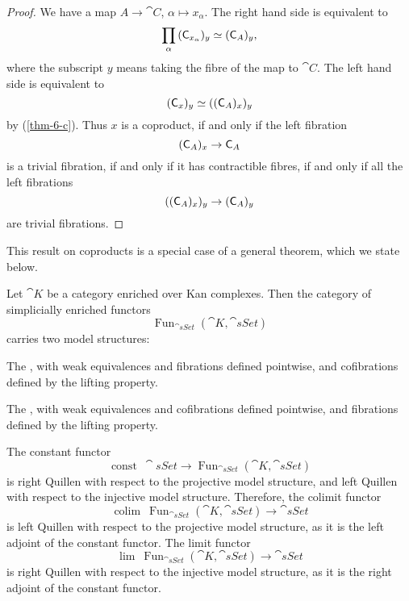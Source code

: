 \begin{proof}
    We have a map $A\to\cat{C}$, $\alpha\mapsto x_\alpha$.
    The right hand side is equivalent to  
    \[ \prod_\alpha{}(\textup{\textsf{C}}_{x_\alpha\/})_y
    \simeq (\textup{\textsf{C}}_{A\/})_y, \]
    where the subscript $y$ means taking the fibre of the map to $\cat C$.
    The left hand side is equivalent to 
    \[ (\textup{\textsf{C}}_{x\/})_y\simeq((\textup{\textsf{C}}_{A\/})_{x\/})_y \]
    by (\ref{thm-6-c}). Thus $x$ is a coproduct, if and only if the left fibration
    \[(\textup{\textsf{C}}_{A\/})_{x\/}\to\textup{\textsf{C}}_{A\/}\]
    is a trivial fibration,
    if and only if it has contractible fibres,
    if and only if all the left fibrations
    \[((\textup{\textsf{C}}_{A\/})_{x\/})_y\to(\textup{\textsf{C}}_{A\/})_y\]
    are trivial fibrations.
\end{proof}

This result on coproducts is a special case of a general theorem,
which we state below.

Let $\cat K$ be a category enriched over Kan complexes.
Then the category of simplicially enriched functors
\[ \operatorname{Fun}_{\cat{sSet}}(\cat K,\cat{sSet}) \]
carries two model structures:
\begin{itms}
    \item The ,
    with weak equivalences and fibrations defined pointwise,
    and cofibrations defined by the lifting property.
    \item The ,
    with weak equivalences and cofibrations defined pointwise,
    and fibrations defined by the lifting property.
\end{itms}
The constant functor
\[ \operatorname{const}\:\cat{sSet}\to\operatorname{Fun}_{\cat{sSet}}(\cat K,\cat{sSet}) \]
is right Quillen with respect to the projective model structure,
and left Quillen with respect to the injective model structure.
Therefore, the colimit functor 
\[ \operatorname{colim}\:\operatorname{Fun}_{\cat{sSet}}(\cat K,\cat{sSet})\to\cat{sSet} \]
is left Quillen with respect to the projective model structure,
as it is the left adjoint of the constant functor.
The limit functor 
\[ \operatorname{lim}\:\operatorname{Fun}_{\cat{sSet}}(\cat K,\cat{sSet})\to\cat{sSet} \]
is right Quillen with respect to the injective model structure,
as it is the right adjoint of the constant functor.

